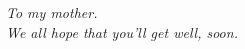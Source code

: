 \pagestyle{empty}%
\vspace*{\fill}%
\begin{center}
\textit{To my mother.\\
We all hope that you'll get well, soon.}
\end{center}
\vspace*{\fill}%